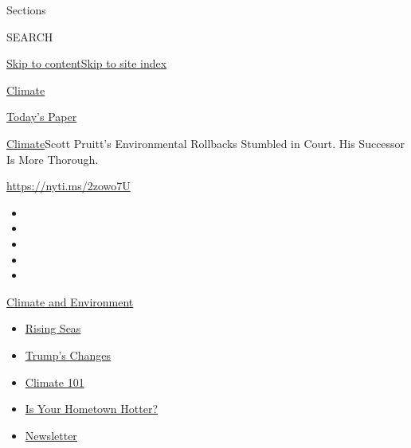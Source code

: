 Sections

SEARCH

\protect\hyperlink{site-content}{Skip to
content}\protect\hyperlink{site-index}{Skip to site index}

\href{https://www.nytimes.com/section/climate}{Climate}

\href{https://myaccount.nytimes.com/auth/login?response_type=cookie\&client_id=vi}{}

\href{https://www.nytimes.com/section/todayspaper}{Today's Paper}

\href{/section/climate}{Climate}\textbar{}Scott Pruitt's Environmental
Rollbacks Stumbled in Court. His Successor Is More Thorough.

\url{https://nyti.ms/2zowo7U}

\begin{itemize}
\item
\item
\item
\item
\item
\end{itemize}

\href{https://www.nytimes.com/section/climate?action=click\&pgtype=Article\&state=default\&region=TOP_BANNER\&context=storylines_menu}{Climate
and Environment}

\begin{itemize}
\tightlist
\item
  \href{https://www.nytimes.com/2020/07/30/climate/sea-level-inland-floods.html?action=click\&pgtype=Article\&state=default\&region=TOP_BANNER\&context=storylines_menu}{Rising
  Seas}
\item
  \href{https://www.nytimes.com/interactive/2020/climate/trump-environment-rollbacks.html?action=click\&pgtype=Article\&state=default\&region=TOP_BANNER\&context=storylines_menu}{Trump's
  Changes}
\item
  \href{https://www.nytimes.com/interactive/2020/04/19/climate/climate-crash-course-1.html?action=click\&pgtype=Article\&state=default\&region=TOP_BANNER\&context=storylines_menu}{Climate
  101}
\item
  \href{https://www.nytimes.com/interactive/2018/08/30/climate/how-much-hotter-is-your-hometown.html?action=click\&pgtype=Article\&state=default\&region=TOP_BANNER\&context=storylines_menu}{Is
  Your Hometown Hotter?}
\item
  \href{https://www.nytimes.com/newsletters/climate-change?action=click\&pgtype=Article\&state=default\&region=TOP_BANNER\&context=storylines_menu}{Newsletter}
\end{itemize}

